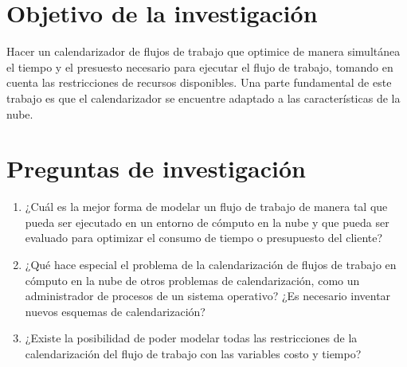 \documentclass[letterpaper]{report}
\begin{document}
\section*{Objetivo de la investigación}
Hacer un calendarizador de flujos de trabajo que optimice de manera simultánea el tiempo y el presuesto necesario para ejecutar el flujo de trabajo, tomando en cuenta las restricciones de recursos disponibles. Una parte fundamental de este trabajo es que el calendarizador se encuentre adaptado a las características de la nube.

\section*{Preguntas de investigación}
\begin{enumerate}
\item ¿Cuál es la mejor forma de modelar un flujo de trabajo de manera tal que pueda ser ejecutado en un entorno de cómputo en la nube y que pueda ser evaluado para optimizar el consumo de tiempo o presupuesto del cliente?
\item ¿Qué hace especial el problema de la calendarización de flujos de trabajo en cómputo en la nube de otros problemas de calendarización, como un administrador de procesos de un sistema operativo? ¿Es necesario inventar nuevos esquemas de calendarización?
\item ¿Existe la posibilidad de poder modelar todas las restricciones de la calendarización del flujo de trabajo con las variables costo y tiempo?
\end{enumerate}
\end{document}
